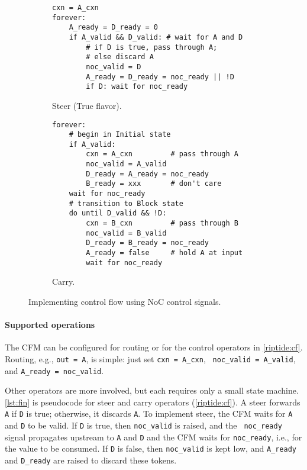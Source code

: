 \begin{figure}[t]
\begin{subfigure}{\linewidth}
\begin{lstlisting}[style=custompython]
cxn = A_cxn
forever:
    A_ready = D_ready = 0
    if A_valid && D_valid: # wait for A and D
        # if D is true, pass through A;
        # else discard A 
        noc_valid = D
        A_ready = D_ready = noc_ready || !D
        if D: wait for noc_ready
\end{lstlisting}
\caption{Steer (True flavor).}
\label{lst:fin:steer}
\end{subfigure}

\begin{subfigure}{\linewidth}
\begin{lstlisting}[style=custompython]
forever:
    # begin in Initial state
    if A_valid:
        cxn = A_cxn         # pass through A
        noc_valid = A_valid
        D_ready = A_ready = noc_ready
        B_ready = xxx       # don't care
    wait for noc_ready
    # transition to Block state
    do until D_valid && !D:
        cxn = B_cxn         # pass through B
        noc_valid = B_valid
        D_ready = B_ready = noc_ready
        A_ready = false     # hold A at input
        wait for noc_ready
\end{lstlisting}
\caption{Carry.}
\label{lst:fin:carry}
\end{subfigure}
  \caption{Implementing control flow using NoC control signals.}
  \label{lst:fin}
\end{figure}

\paragraph{Supported operations}
The CFM can be configured for routing or for the control operators in
\autoref{riptide:cf}.
%
Routing, e.g., {\tt out = A}, is simple: just set {\tt cxn = A\_cxn}, {\tt
noc\_valid = A\_valid}, and {\tt A\_ready = noc\_valid}.

Other operators are more involved, but each requires only a
small state machine.
%
\autoref{lst:fin} is pseudocode for steer and carry operators
(\autoref{riptide:cf}).
%
A steer forwards {\tt A} if {\tt D} is true; otherwise,
it discards {\tt A}.
%
To implement steer, the CFM waits for {\tt A} and {\tt D}
to be valid.
%
If {\tt D} is true, then {\tt noc\_valid} is raised, and the {\tt
  noc\_ready} signal propagates upstream to {\tt A} and {\tt D}
and the CFM waits for {\tt noc\_ready}, i.e., for the value to be consumed.
%
If {\tt D} is false, then {\tt noc\_valid} is kept low, and
{\tt A\_ready} and {\tt D\_ready} are raised to discard these
tokens.

